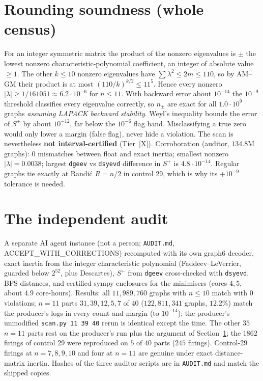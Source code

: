 \documentclass[10pt]{article}
\newcommand{\tier}[1]{\textsf{[#1]}}
\newcommand{\tX}{\tier{X}}
\begin{document}
\section{Rounding soundness (whole census)}\label{sec:sound}
For an integer symmetric matrix the product of the nonzero eigenvalues is $\pm$ the lowest nonzero characteristic-polynomial coefficient, an integer of absolute value $\ge1$. The other $k\le10$ nonzero eigenvalues have $\sum\lambda^2\le2m\le110$, so by AM--GM their product is at most $(110/k)^{k/2}\le11^5$. Hence every nonzero $|\lambda|\ge1/161051\approx6.2\cdot10^{-6}$ for $n\le11$. With backward error about $10^{-14}$ the $10^{-9}$ threshold classifies every eigenvalue correctly, so $n_\pm$ are exact for all $1.0\cdot10^{9}$ graphs \emph{assuming LAPACK backward stability}. Weyl's inequality bounds the error of $S^+$ by about $10^{-12}$, far below the $10^{-6}$ flag band. Misclassifying a true zero would only lower a margin (false flag), never hide a violation. The scan is nevertheless \textbf{not interval-certified} (Tier~\tX{}). Corroboration (auditor, $134.8$M graphs): $0$ mismatches between float and exact inertia; smallest nonzero $|\lambda|=0.0038$; largest \texttt{dgeev} vs \texttt{dsyevd} difference in $S^+$ is $4.8\cdot10^{-14}$. Regular graphs tie exactly at Randi\'c $R=n/2$ in control 29, which is why its $+10^{-9}$ tolerance is needed.

\section{The independent audit}\label{sec:audit}
A separate AI agent instance (not a person; \texttt{AUDIT.md}, ACCEPT\_WITH\_CORRECTIONS) recomputed with its own graph6 decoder, exact inertia from the integer characteristic polynomial (Faddeev--LeVerrier, guarded below $2^{52}$, plus Descartes), $S^+$ from \texttt{dgeev} cross-checked with \texttt{dsyevd}, BFS distances, and certified sympy enclosures for the minimisers (cores $4,5$, about $4.9$ core-hours). Results: all $11{,}989{,}760$ graphs with $n\le10$ match with $0$ violations; $n=11$ parts $31,39,12,5,7$ of $40$ ($122{,}811{,}341$ graphs, $12.2\%$) match the producer's logs in every count and margin (to $10^{-14}$); the producer's unmodified \texttt{scan.py 11 39 40} rerun is identical except the time. The other $35$ $n=11$ parts rest on the producer's run plus the argument of Section~\ref{sec:sound}; the $1862$ firings of control 29 were reproduced on $5$ of $40$ parts ($245$ firings). Control-29 firings at $n=7,8,9,10$ and four at $n=11$ are genuine under exact distance-matrix inertia. Hashes of the three auditor scripts are in \texttt{AUDIT.md} and match the shipped copies.
\end{document}
